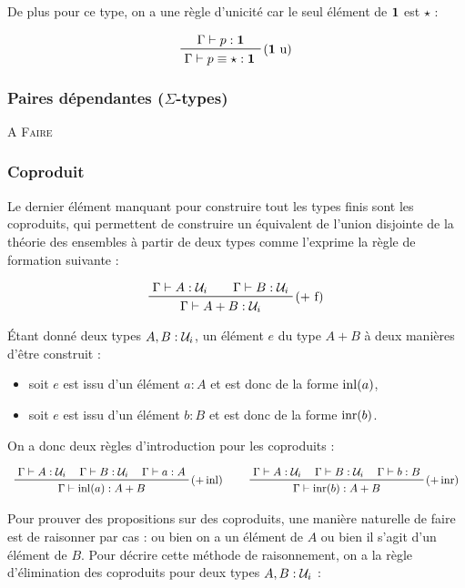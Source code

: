\documentclass[../../rapport.tex]{subfiles}
\begin{document}
  De plus pour ce type, on a une règle d'unicité car le seul élément de $\operatorname{\textbf{1}}$ est $\star$ :

  $$
  \prfinterspace=2em
  \prftree[r]{($\1$ u)}
    {\Gamma \vdash p : \1}
    {\Gamma \vdash p \equiv \star : \1}
  $$

  \subsubsection{Paires dépendantes ($\Sigma$-types)}

  \textsc{A Faire}

  \subsubsection{Coproduit}

  Le dernier élément manquant pour construire tout les types finis sont les coproduits,
  qui permettent de construire un équivalent de l'union disjointe de la théorie des ensembles à partir de deux types
  comme l'exprime la règle de formation suivante :

  $$
  \prfinterspace=2em
  \prftree[r]{($+$ f)}{\Gamma \vdash A : \U_i}{\Gamma \vdash B : \U_i}
    {\Gamma \vdash A + B : \U_i}
  $$

  Étant donné deux types $A, B : \mathcal U_i$, un élément $e$ du type $A + B$ à deux manières d'être construit :
  \begin{itemize}
    \item soit $e$ est issu d'un élément $a : A$ et est donc de la forme $\operatorname{inl}(a)$,
    \item soit $e$ est issu d'un élément $b : B$ et est donc de la forme $\operatorname{inr}(b)$.
  \end{itemize}
  On a donc deux règles d'introduction pour les coproduits :

  $$
  \prfinterspace=1.2em
  \begin{array}{cc}
    \prftree[r]{($+ \inl)$}{\Gamma \vdash A : \U_i}{\Gamma \vdash B : \U_i}{\Gamma \vdash a : A}{\Gamma \vdash \inl(a) : A + B} \hspace{0.5cm}
    & \prftree[r]{($+ \inr)$}{\Gamma \vdash A : \U_i}{\Gamma \vdash B : \U_i}{\Gamma \vdash b : B}{\Gamma \vdash \inr(b) : A + B}
  \end{array}
  $$

  Pour prouver des propositions sur des coproduits, une manière naturelle de faire est de raisonner par cas :
  ou bien on a un élément de $A$ ou bien il s'agit d'un élément de $B$.
  Pour décrire cette méthode de raisonnement, on a la règle d'élimination des coproduits pour deux types $A, B : \mathcal U_i$ :
\end{document}
